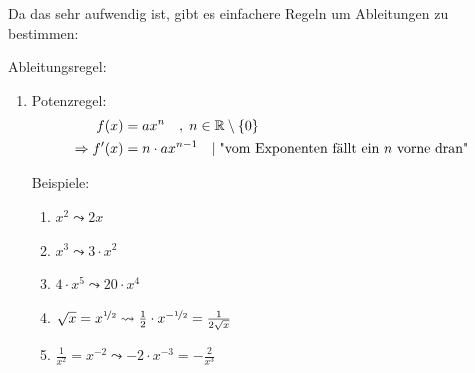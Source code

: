 Da das sehr aufwendig ist, gibt es einfachere Regeln um Ableitungen zu bestimmen:

Ableitungsregel:
\begin{enumerate}
    \item Potenzregel:
    \begin{align}
        f(x) &= ax^n \quad,\; n \in \R\setminus\{0\}\\ %
        \Rightarrow f'(x) &= n \cdot ax^{n-1} \mcomm \text{"vom Exponenten fällt ein \(n\) vorne dran"}
    \end{align}

    Beispiele:
    \begin{enumerate}
        \item \(x^2 \leadsto 2x\)
        \item \(x^3 \leadsto 3\cdot x^2\)
        \item \(4\cdot x^5 \leadsto 20\cdot x^4\)
        \item \(\sqrt{x} = x^{\nicefrac{1}{2}} \leadsto \frac{1}{2}\cdot x^{-\nicefrac{1}{2}}=\frac{1}{2\sqrt{x}}\)
        \item \(\frac{1}{x^2}=x^{-2} \leadsto -2\cdot x^{-3} = -\frac{2}{x^3}\)
    \end{enumerate}


\end{enumerate}
